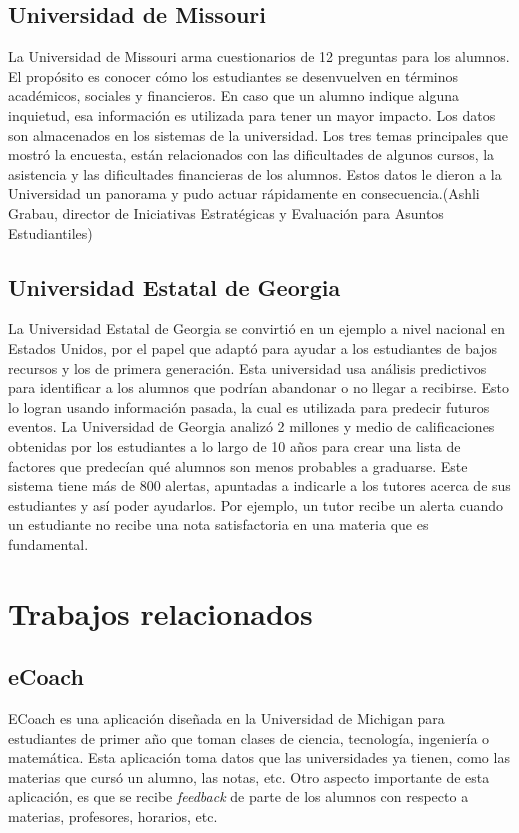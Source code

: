 \subsection[Universidad de Missouri]{Universidad de Missouri}
La Universidad de Missouri arma cuestionarios de 12 preguntas para los alumnos. El propósito es conocer cómo los estudiantes se desenvuelven en términos académicos, sociales y financieros. En caso que un alumno indique alguna inquietud, esa información es utilizada para tener un mayor impacto. Los datos son almacenados en los sistemas de la universidad.
Los tres temas principales que mostró la encuesta, están relacionados con las dificultades de algunos cursos, la asistencia y las dificultades financieras de los alumnos. Estos datos le dieron a la Universidad un panorama y pudo actuar rápidamente en consecuencia.(Ashli Grabau, director de Iniciativas Estratégicas y Evaluación para Asuntos Estudiantiles)

\subsection[Universidad Estatal de Georgia]{Universidad Estatal de Georgia}

La Universidad Estatal de Georgia se convirtió en un ejemplo a nivel nacional en Estados Unidos, por el papel que adaptó para ayudar a los estudiantes de bajos recursos y los de primera generación. 
Esta universidad usa análisis predictivos para identificar a los alumnos que podrían abandonar o no llegar a recibirse. Esto lo logran usando información pasada, la cual es utilizada para predecir futuros eventos. 
La Universidad de Georgia analizó 2 millones y medio de calificaciones obtenidas por los estudiantes a lo largo de 10 años para crear una lista de factores que predecían qué alumnos son menos probables a graduarse. Este sistema tiene más de 800 alertas, apuntadas a indicarle a los tutores acerca de sus estudiantes y así poder ayudarlos. Por ejemplo, un tutor recibe un alerta cuando un estudiante no recibe una nota satisfactoria en una materia que es fundamental. 





\section[Trabajos relacionados]{Trabajos relacionados}

\subsection[eCoach]{eCoach}
ECoach es una aplicación diseñada en la Universidad de Michigan para estudiantes de primer año que toman clases de ciencia, tecnología, ingeniería o matemática. Esta aplicación toma datos que las universidades ya tienen, como las materias que cursó un alumno, las notas, etc.
Otro aspecto importante de esta aplicación, es que se recibe \textit{feedback} de parte de los alumnos con respecto a materias, profesores, horarios, etc.

